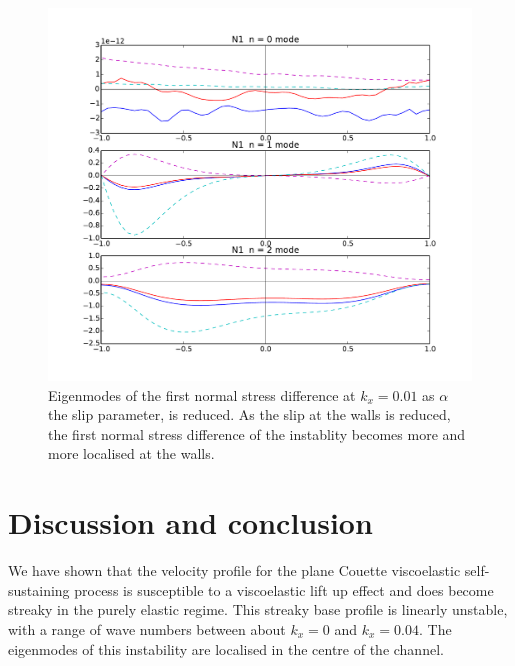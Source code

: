 \documentclass{jfm}
\begin{document}
\begin{figure}
    \centering
    \includegraphics[width=\textwidth]{./figures/eigenmode_varslip}
    \caption{
	Eigenmodes of the first normal stress difference at $k_x=0.01$ as
	$\alpha$ the slip parameter, is reduced. As the slip at the walls is
	reduced, the first normal stress difference of the instablity becomes
	more and more localised at the walls.
}
    \label{fig:eigenmode_varslip}
\end{figure}


\section{Discussion and conclusion}\label{sec:conclusion}

We have shown that the velocity profile for the plane Couette viscoelastic
self-sustaining process is susceptible to a viscoelastic lift up effect and
does become streaky in the purely elastic regime. This streaky base profile is
linearly unstable, with a range of wave numbers between about $k_x = 0$ and
$k_x = 0.04$. The eigenmodes of this instability are localised in the centre of
the channel.


\end{document}
